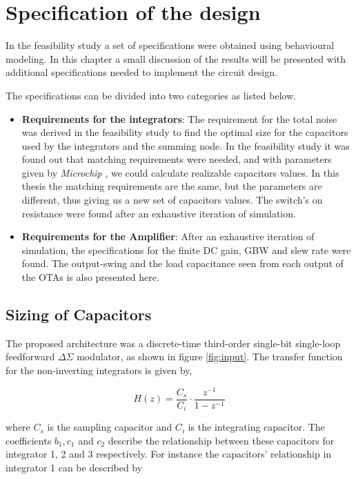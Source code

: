 \chapter{Specification of the design}\label{specifiation}
In the feasibility study a set of specifications were obtained using behavioural modeling. In this chapter a small discussion of the results will be presented with additional specifications needed to implement the circuit design.

The specifications can be divided into two categories as listed below. 
\begin{itemize}


\item \textbf{Requirements for the integrators}: The requirement for the total noise was derived in the feasibility study to find the optimal size for the capacitors used by the integrators and the summing node. In the feasibility study it was found out that matching requirements were needed, and with parameters given by \textit{Microchip} \cite{private}, we could calculate realizable capacitors values. In this thesis the matching requirements are the same, but the parameters are different, thus giving us a new set of capacitors values. The switch's on resistance were found after an exhaustive iteration of simulation.

\item \textbf{Requirements for the Amplifier}: After an exhaustive iteration of simulation, the specifications for the finite DC gain, GBW and slew rate were found. The output-swing and the load capacitance seen from each output of the OTAs is also presented here. 
\end{itemize}

\section{Sizing of Capacitors}
The proposed architecture was a discrete-time third-order single-bit single-loop feedforward $\Delta\Sigma$ modulator, as shown in figure \ref{fig:input}. The transfer function for the non-inverting integrators is given by,

\begin{equation}\label{transfer_integrator}
    H(z) = \frac{C_s}{C_i}\cdot \frac{z^{-1}}{1 - z^{-1}}
\end{equation}

where $C_s$ is the sampling capacitor and $C_i$ is the integrating capacitor. The coefficients $b_1, c_1$ and $c_2$ describe the relationship between these capacitors for integrator 1, 2 and 3 respectively. For instance the capacitors' relationship in integrator 1 can be described by

